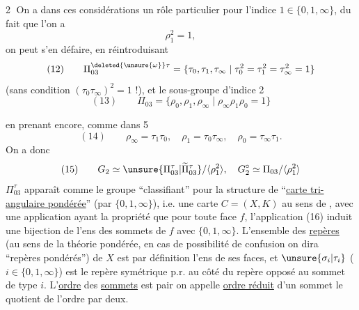 \textcircled{2} On a dans ces considérations un rôle particulier pour l'indice $1\in\{0,1,\infty\}$, du fait que l'on a
\[
\rho_1^2=1,
\]
on peut s'en défaire, en réintroduisant
\[
(12)\qquad\Pi_{03}^{\deleted{\unsure{\omega}}\tau}=\{\tau_0,\tau_1,\tau_\infty\mid\tau_0^2=\tau_1^2=\tau_\infty^2=1\}
\]
(sans condition $(\tau_0\tau_\infty)^2=1$ !), et le sous-groupe d'indice 2
\[
(13)\qquad\Pi_{03}=\{\rho_0,\rho_1,\rho_\infty\mid\rho_\infty\rho_1\rho_0=1\}
\]

en prenant encore, comme dans 5
\[
(14)\qquad\rho_\infty=\tau_1\tau_0,\quad\rho_1=\tau_0\tau_\infty,\quad\rho_0=\tau_\infty\tau_1.
\]
On a donc
\[
(15)\qquad G_2\simeq\unsure{\Pi_{03}^\tau|\widetilde\Pi_{03}^\tau}/\langle\rho_1^2\rangle,
\quad G_2^\circ\simeq\Pi_{03}/\langle\rho_1^2\rangle
\]
   $\Pi_{03}^\tau$ apparaît comme le groupe ``classifiant'' pour la structure de ``\uline{carte tri-angulaire pondérée}'' (par $\{0,1,\infty\}$), i.e. une carte $C=(X,K)$ au sens de , avec  une application
ayant la propriété que pour toute face $f$, l'application (16) induit une bijection de l'ens des sommets de $f$ avec $\{0,1,\infty\}$. L'ensemble des \uline{repères} (au sens de la théorie  pondérée, en cas de possibilité de confusion on dira ``repères pondérés'') de $X$ est par définition l'ens de ses faces, et $\unsure{\sigma_i|\tau_i}$ ($i\in\{0,1,\infty\}$) est le  repère symétrique p.r. au  côté du repère opposé au  sommet de type $i$. L'\uline{ordre} des \uline{sommets} est pair on appelle \uline{ordre réduit} d'un sommet le quotient de l'ordre par  deux.

